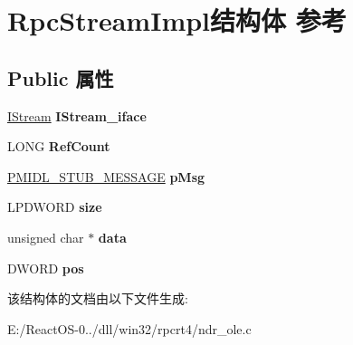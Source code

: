 \hypertarget{struct_rpc_stream_impl}{}\section{Rpc\+Stream\+Impl结构体 参考}
\label{struct_rpc_stream_impl}
\subsection*{Public 属性}
\begin{DoxyCompactItemize}
\item 
\mbox{\label{struct_rpc_stream_impl_a1fae9e7af00efc139b312368ae0589e5}} 
\hyperlink{interface_i_stream}{I\+Stream} {\bfseries I\+Stream\+\_\+iface}
\item 
\mbox{\label{struct_rpc_stream_impl_a8c3aee697c61d94580412274821e1752}} 
L\+O\+NG {\bfseries Ref\+Count}
\item 
\mbox{\label{struct_rpc_stream_impl_aa0b820c82f788e6851c29672d8f24dde}} 
\hyperlink{struct___m_i_d_l___s_t_u_b___m_e_s_s_a_g_e}{P\+M\+I\+D\+L\+\_\+\+S\+T\+U\+B\+\_\+\+M\+E\+S\+S\+A\+GE} {\bfseries p\+Msg}
\item 
\mbox{\label{struct_rpc_stream_impl_acb6a1b399018fa1223a709f3b9672c00}} 
L\+P\+D\+W\+O\+RD {\bfseries size}
\item 
\mbox{\label{struct_rpc_stream_impl_a61db803da97252d7145fd55e0e5c40b5}} 
unsigned char $\ast$ {\bfseries data}
\item 
\mbox{\label{struct_rpc_stream_impl_acae012f028eab34b2b437f80be5d3ad4}} 
D\+W\+O\+RD {\bfseries pos}
\end{DoxyCompactItemize}


该结构体的文档由以下文件生成\+:\begin{DoxyCompactItemize}
\item 
E\+:/\+React\+O\+S-\/0../dll/win32/rpcrt4/ndr\+\_\+ole.\+c\end{DoxyCompactItemize}
